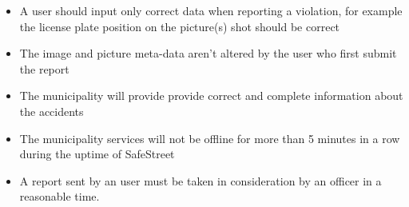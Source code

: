 \begin{itemize}

\item A user should input only correct data when reporting a violation, for example the license plate position on the picture(s) shot should be correct

\item The image and picture meta-data aren't altered by the user who first submit the report

\item The municipality will provide provide correct and complete information 
about the accidents

\item The municipality services will not be offline for more than 5 minutes in a row during the uptime of SafeStreet
\item A report sent by an user must be taken in consideration by an officer in a reasonable time.

\end{itemize}